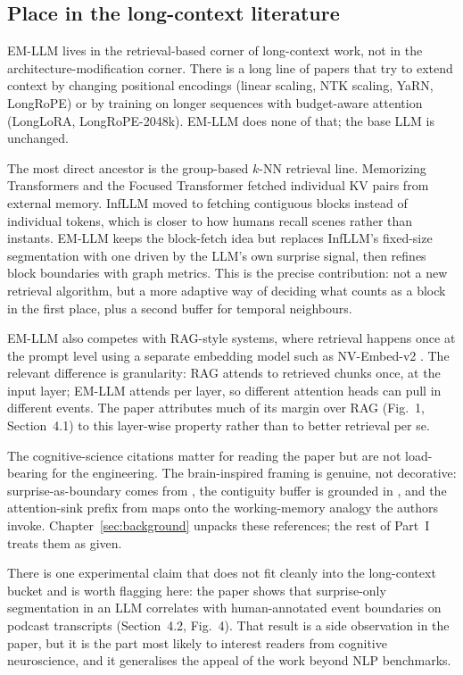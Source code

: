 \subsection{Place in the long-context literature}
\label{sec:literature}

EM-LLM lives in the retrieval-based corner of long-context work, not in the architecture-modification corner. There is a long line of papers that try to extend context by changing positional encodings (linear scaling, NTK scaling, YaRN, LongRoPE) or by training on longer sequences with budget-aware attention (LongLoRA, LongRoPE-2048k). EM-LLM does none of that; the base LLM is unchanged.

The most direct ancestor is the group-based $k$-NN retrieval line. Memorizing Transformers \cite{wu2022memorizing} and the Focused Transformer \cite{tworkowski2023focused} fetched individual KV pairs from external memory. InfLLM \cite{xiao2024infllm} moved to fetching contiguous blocks instead of individual tokens, which is closer to how humans recall scenes rather than instants. EM-LLM keeps the block-fetch idea but replaces InfLLM's fixed-size segmentation with one driven by the LLM's own surprise signal, then refines block boundaries with graph metrics. This is the precise contribution: not a new retrieval algorithm, but a more adaptive way of deciding what counts as a block in the first place, plus a second buffer for temporal neighbours.

EM-LLM also competes with RAG-style systems, where retrieval happens once at the prompt level using a separate embedding model such as NV-Embed-v2 \cite{lee2024nvembed}. The relevant difference is granularity: RAG attends to retrieved chunks once, at the input layer; EM-LLM attends per layer, so different attention heads can pull in different events. The paper attributes much of its margin over RAG (Fig.~1, Section~4.1) to this layer-wise property rather than to better retrieval per se.

The cognitive-science citations matter for reading the paper but are not load-bearing for the engineering. The brain-inspired framing is genuine, not decorative: surprise-as-boundary comes from \textcite{zacks2007event}, the contiguity buffer is grounded in \textcite{howard2002contiguity}, and the attention-sink prefix from \textcite{xiao2024attsinks} maps onto the working-memory analogy the authors invoke. Chapter~\ref{sec:background} unpacks these references; the rest of Part~I treats them as given.

There is one experimental claim that does not fit cleanly into the long-context bucket and is worth flagging here: the paper shows that surprise-only segmentation in an LLM correlates with human-annotated event boundaries on podcast transcripts (Section~4.2, Fig.~4). That result is a side observation in the paper, but it is the part most likely to interest readers from cognitive neuroscience, and it generalises the appeal of the work beyond NLP benchmarks.
